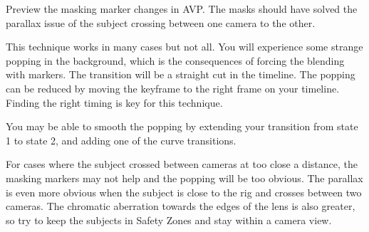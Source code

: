\begin{fullwidth}

Preview the masking marker changes in AVP. The masks should have solved the parallax issue of the subject crossing between one camera to the other.

This technique works in many cases but not all. You will experience some strange popping in the background, which is the consequences of forcing the blending with markers. The transition will be a straight cut in the timeline. The popping can be reduced by moving the keyframe to the right frame on your timeline. Finding the right timing is key for this technique. 

\tip You may be able to smooth the popping by extending your transition from state 1 to state 2, and adding one of the curve transitions.


For cases where the subject crossed between cameras at too close a distance, the masking markers may not help and the popping will be too obvious. The parallax is even more obvious when the subject is close to the rig and crosses between two cameras. The chromatic aberration towards the edges of the lens is also greater, so try to keep the subjects in Safety Zones and stay within a camera view.

\clearpage
\end{fullwidth}
